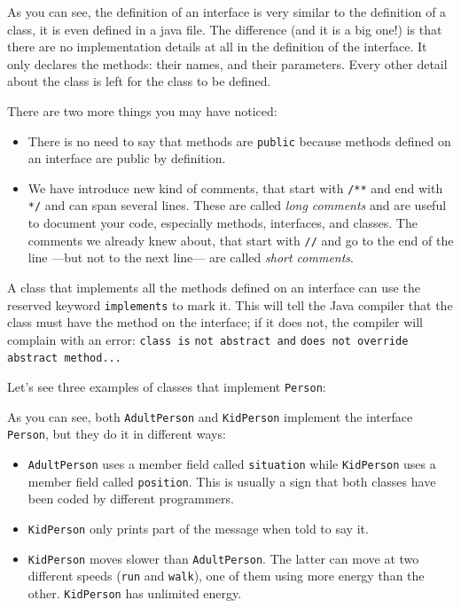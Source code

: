 
As you can see, the definition of an interface is very similar to the
definition of a class, it is even defined in a java file. 
The difference (and it is a big one!) is that
there are no implementation details at all in the definition of the
interface. It only declares the methods: their names, and their
parameters. Every other detail about the class is left for the class
to be defined. 

There are two more things you may have noticed: 

\begin{itemize}
\item There is no need to say that methods are \verb+public+
  because methods defined on an interface are public by definition.
\item We have introduce new kind of comments, that start with
  \verb+/**+ and end with \verb+*/+ and can span several lines. These
  are called \emph{long comments} and are useful to document your
  code, especially methods, interfaces, and classes. The comments we
  already knew about, that start with \verb+//+ and go to the end of
  the line ---but not to the next line--- are called \emph{short
    comments}. 
\end{itemize}

A class that implements all the methods defined on an interface can
use the reserved keyword \verb+implements+ to mark it. This will tell
the Java compiler that the class must have the method on the
interface; if it does not, the compiler will complain with an error:
\verb+class is+ \verb+not abstract and+ \verb+does not override+
\verb+abstract method...+ 

Let's see three examples of classes that implement \verb+Person+:



As you can see, both \verb+AdultPerson+ and \verb+KidPerson+ implement
the interface \verb+Person+, but they do it in different ways: 

\begin{itemize}
\item \verb+AdultPerson+ uses a member field called \verb+situation+
  while \verb+KidPerson+ uses a member field called
  \verb+position+. This is usually a sign that both classes have been
  coded by different programmers.
\item \verb+KidPerson+ only prints part of the message when told to
  say it.
\item \verb+KidPerson+ moves slower than \verb+AdultPerson+. The
  latter can move at two different speeds (\verb+run+ and
  \verb+walk+), one of them using more 
  energy than the other. \verb+KidPerson+ has unlimited energy. 
\end{itemize}

